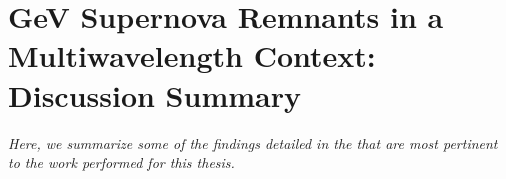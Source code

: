 



\section{GeV Supernova Remnants in a Multiwavelength Context: Discussion Summary}\label{snrcat:resSum}
\emph{Here, we summarize some of the findings detailed in the \snrcat{} that are most pertinent to the work performed for this thesis.} 

